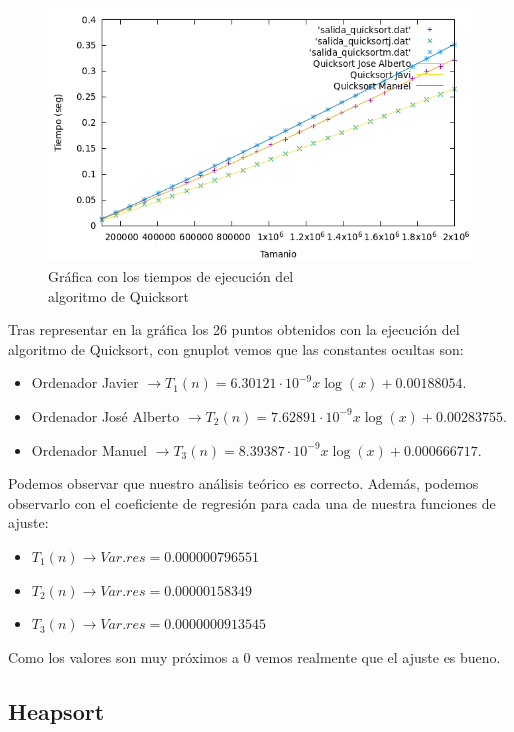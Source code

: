 \documentclass[10pt,a4paper]{article}
\begin{document}
\begin{figure}[h!]
\centering
\includegraphics[scale=0.15]{../../Images/Quicksort_combinados.png}
\caption{Gráfica con los tiempos de ejecución del \\algoritmo de Quicksort}
\end{figure}

Tras representar en la gráfica los 26 puntos obtenidos con la ejecución del algoritmo de Quicksort, con gnuplot vemos que las constantes ocultas son:
\begin{itemize}
	\item Ordenador Javier \(\rightarrow T_1(n) = 6.30121 \cdot 10^{-9} x\log(x) + 0.00188054\). 
	\item Ordenador José Alberto \(\rightarrow T_2(n) = 7.62891 \cdot 10^{-9} x\log(x) + 0.00283755\).
	\item Ordenador Manuel \(\rightarrow T_3(n) = 8.39387 \cdot 10^{-9} x\log(x) + 0.000666717\).
\end{itemize} 

Podemos observar que nuestro análisis teórico es correcto. Además, podemos observarlo con el coeficiente de regresión para cada una de nuestra funciones de ajuste:
\begin{itemize}
	\item \(T_1(n) \longrightarrow Var.res = 0.000000796551\)
	\item \(T_2(n) \longrightarrow Var.res = 0.00000158349\)
	\item \(T_3(n) \longrightarrow Var.res = 0.0000000913545\)
\end{itemize}

Como los valores son muy próximos a 0 vemos realmente que el ajuste es bueno.

\subsection{Heapsort}

\end{document}
